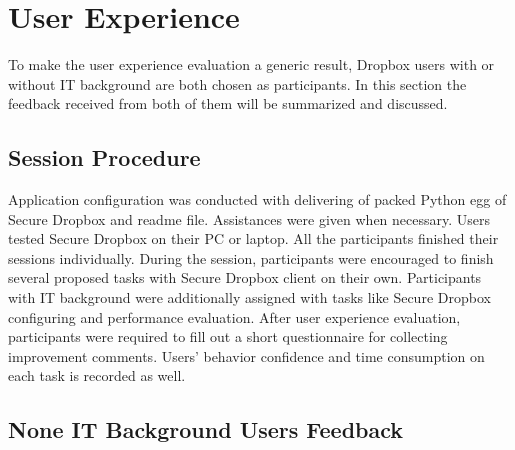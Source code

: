 \section{User Experience}

To make the user experience evaluation a generic result, Dropbox users with or without IT background are both chosen as participants. In this section the feedback received from both of them will be summarized and discussed.

\subsection{Session Procedure}

Application configuration was conducted with delivering of packed Python egg of Secure Dropbox and readme file. Assistances were given when necessary. Users tested Secure Dropbox on their PC or laptop. All the participants finished their sessions individually. During the session, participants were encouraged to finish several proposed tasks with Secure Dropbox client on their own. Participants with IT background were additionally assigned with tasks like Secure Dropbox configuring and performance evaluation. After user experience evaluation, participants were required to fill out a short questionnaire for collecting improvement comments. Users’ behavior confidence and time consumption on each task is recorded as well.

\subsection{None IT Background Users Feedback}

